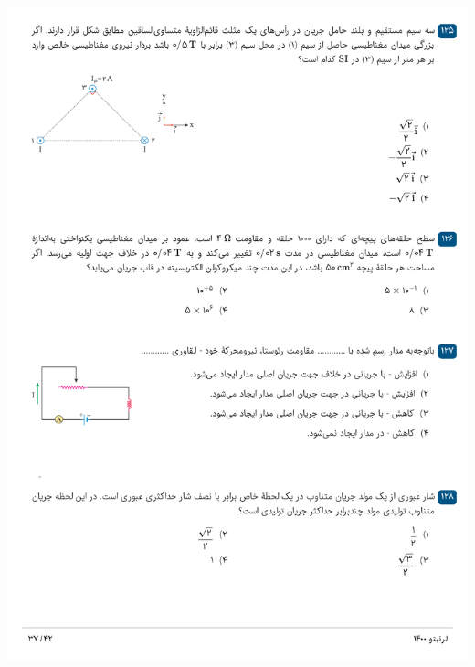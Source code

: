 \documentclass{book}
\begin{document}
\includegraphics[width=\textwidth]{"pages/37"}
\end{document}

